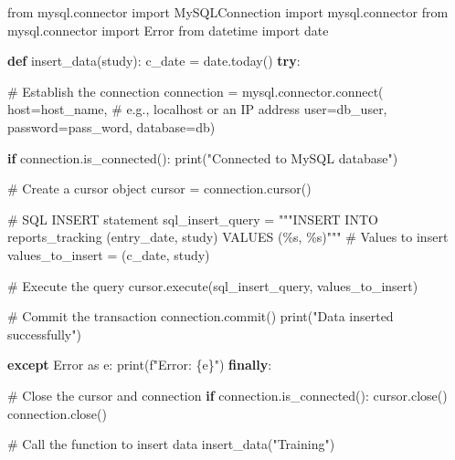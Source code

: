 \documentclass[
  letterpaper,
  DIV=11,
  numbers=noendperiod]{scrreprt}
\newenvironment{Shaded}{\begin{snugshade}}{\end{snugshade}}
\newcommand{\BuiltInTok}[1]{\textcolor[rgb]{0.00,0.23,0.31}{#1}}
\newcommand{\CommentTok}[1]{\textcolor[rgb]{0.37,0.37,0.37}{#1}}
\newcommand{\ControlFlowTok}[1]{\textcolor[rgb]{0.00,0.23,0.31}{\textbf{#1}}}
\newcommand{\ExtensionTok}[1]{\textcolor[rgb]{0.00,0.23,0.31}{#1}}
\newcommand{\ImportTok}[1]{\textcolor[rgb]{0.00,0.46,0.62}{#1}}
\newcommand{\KeywordTok}[1]{\textcolor[rgb]{0.00,0.23,0.31}{\textbf{#1}}}
\newcommand{\NormalTok}[1]{\textcolor[rgb]{0.00,0.23,0.31}{#1}}
\newcommand{\OperatorTok}[1]{\textcolor[rgb]{0.37,0.37,0.37}{#1}}
\newcommand{\SpecialCharTok}[1]{\textcolor[rgb]{0.37,0.37,0.37}{#1}}
\newcommand{\SpecialStringTok}[1]{\textcolor[rgb]{0.13,0.47,0.30}{#1}}
\newcommand{\StringTok}[1]{\textcolor[rgb]{0.13,0.47,0.30}{#1}}
\begin{document}
\begin{Shaded}
\begin{Highlighting}[]
\ImportTok{from}\NormalTok{ mysql.connector }\ImportTok{import}\NormalTok{ MySQLConnection}
\ImportTok{import}\NormalTok{ mysql.connector}
\ImportTok{from}\NormalTok{ mysql.connector }\ImportTok{import}\NormalTok{ Error}
\ImportTok{from}\NormalTok{ datetime }\ImportTok{import}\NormalTok{ date}


\KeywordTok{def}\NormalTok{ insert\_data(study):}
\NormalTok{    c\_date }\OperatorTok{=}\NormalTok{ date.today()}
    \ControlFlowTok{try}\NormalTok{:}
        
        \CommentTok{\# Establish the connection}
\NormalTok{        connection }\OperatorTok{=}\NormalTok{ mysql.connector.}\ExtensionTok{connect}\NormalTok{(}
\NormalTok{            host}\OperatorTok{=}\NormalTok{host\_name,  }\CommentTok{\# e.g., \textquotesingle{}localhost\textquotesingle{} or an IP address}
\NormalTok{            user}\OperatorTok{=}\NormalTok{db\_user,}
\NormalTok{            password}\OperatorTok{=}\NormalTok{pass\_word,}
\NormalTok{            database}\OperatorTok{=}\NormalTok{db)     }

        \ControlFlowTok{if}\NormalTok{ connection.is\_connected():}
                \BuiltInTok{print}\NormalTok{(}\StringTok{"Connected to MySQL database"}\NormalTok{)}

                \CommentTok{\# Create a cursor object}
\NormalTok{                cursor }\OperatorTok{=}\NormalTok{ connection.cursor()}

                \CommentTok{\# SQL INSERT statement}
\NormalTok{                sql\_insert\_query }\OperatorTok{=} \StringTok{"""INSERT INTO reports\_tracking (entry\_date, study)}
\StringTok{                                    VALUES (}\SpecialCharTok{\%s}\StringTok{, }\SpecialCharTok{\%s}\StringTok{)"""}
                \CommentTok{\# Values to insert}
\NormalTok{                values\_to\_insert }\OperatorTok{=}\NormalTok{ (c\_date, study)}

                \CommentTok{\# Execute the query}
\NormalTok{                cursor.execute(sql\_insert\_query, values\_to\_insert)}

                \CommentTok{\# Commit the transaction}
\NormalTok{                connection.commit()}
                \BuiltInTok{print}\NormalTok{(}\StringTok{"Data inserted successfully"}\NormalTok{)}

    \ControlFlowTok{except}\NormalTok{ Error }\ImportTok{as}\NormalTok{ e:}
        \BuiltInTok{print}\NormalTok{(}\SpecialStringTok{f"Error: }\SpecialCharTok{\{}\NormalTok{e}\SpecialCharTok{\}}\SpecialStringTok{"}\NormalTok{)}
    \ControlFlowTok{finally}\NormalTok{:}

        \CommentTok{\# Close the cursor and connection}
        \ControlFlowTok{if}\NormalTok{ connection.is\_connected():}
\NormalTok{            cursor.close()}
\NormalTok{            connection.close()}

\CommentTok{\# Call the function to insert data}
\NormalTok{insert\_data(}\StringTok{"Training"}\NormalTok{)}
\end{Highlighting}
\end{Shaded}
\end{document}
